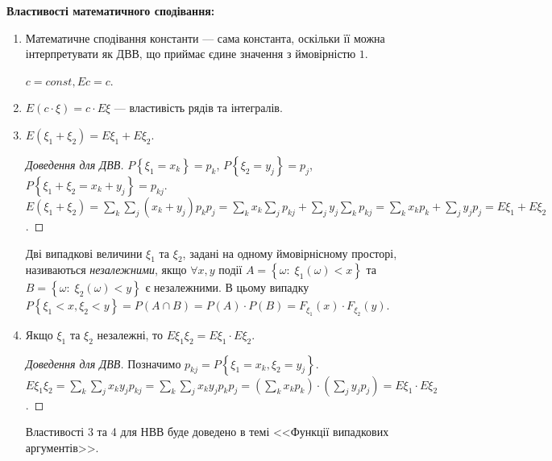 \noindent \textbf{Властивості математичного сподівання:}
\begin{enumerate}
    \item Математичне сподівання константи --- сама константа, оскільки
    її можна інтерпретувати як ДВВ, що приймає єдине значення з ймовірністю $1$.
    
    $c = const, E c = c$.
    \item $E \left(c\cdot\xi\right) = c\cdot E\xi$ --- властивість рядів та інтегралів.
    \item $E\left( \xi_1 + \xi_2\right) = E\xi_1 + E\xi_2$.
    \begin{proof}[Доведення для ДВВ]
        $P\left\{\xi_1 = x_k\right\} = p_k$, $P\left\{\xi_2 = y_j\right\} = p_j$, $P\left\{\xi_1 + \xi_2 = x_k + y_j\right\} = p_{kj}$.
        $E\left( \xi_1 + \xi_2\right) = \sum_k \sum_j (x_k+y_j) p_k p_j =
        \sum_k x_k \sum_j p_{kj} + \sum_j y_j \sum_k p_{kj} = \sum_k x_k p_k + \sum_j y_j p_j = E\xi_1 + E\xi_2$.
    \end{proof}
\begin{definition}
    Дві випадкові величини $\xi_1$ та $\xi_2$, задані на одному ймовірнісному просторі, називаються \emph{незалежними}, якщо
    $\forall x, y$ події $A=\left\{\omega : \; \xi_1(\omega) < x\right\}$ та
    $B=\left\{\omega : \; \xi_2(\omega) < y\right\}$ є незалежними.
    В цьому випадку $P\left\{\xi_1 < x, \xi_2 < y\right\} = P(A \cap B) = P(A)\cdot P(B) = F_{\xi_1}(x)\cdot F_{\xi_2}(y)$.
\end{definition}
    \item Якщо $\xi_1$ та $\xi_2$ незалежні, то $E\xi_1\xi_2 = E\xi_1 \cdot E\xi_2$.
    \begin{proof}[Доведення для ДВВ]
        Позначимо $p_{kj} = P\left\{\xi_1 = x_k, \xi_2 = y_j\right\}$.
        $E\xi_1\xi_2 = \sum_k \sum_j x_k y_j p_{kj} = \sum_k \sum_j x_k y_j p_k p_j = ( \sum_k x_k p_k)\cdot ( \sum_j y_j p_j) = E\xi_1 \cdot E\xi_2$.
    \end{proof}
    Властивості 3 та 4 для НВВ буде доведено в темі <<Функції випадкових аргументів>>.
\end{enumerate}

